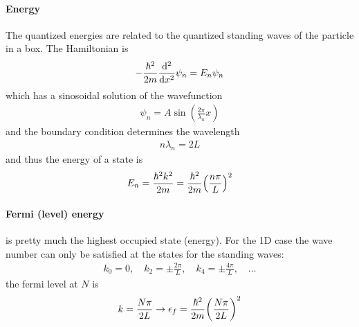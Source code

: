 \documentclass[../main.tex]{subfiles}
\begin{document}
\paragraph*{Energy} The quantized energies are related to the quantized standing waves of the 
particle in a box. The Hamiltonian is
\begin{align*}
    -\frac{\hbar^2}{2m} \dv[2]{x} \psi_n = E_n \psi_n
\end{align*}
which has a sinosoidal solution of the wavefunction
\begin{align*}
    \psi_n = A \sin(\frac{2\pi}{\lambda_n} x) 
\end{align*}
and the boundary condition determines the wavelength
\begin{align*}
    n \lambda_n = 2L
\end{align*}
and thus the energy of a state is
\begin{align*}
    E_n = \frac{\hbar^2 k^2}{2m} = \frac{\hbar^2}{2m} \qt(\frac{n\pi}{L})^2
\end{align*}

\paragraph*{Fermi (level) energy} is pretty much the highest occupied state (energy). For the 1D 
case the wave number can only be satisfied at the states for the standing waves:
\begin{align*}
    k_0 = 0, \quad k_2 = \pm \frac{2\pi}{L}, \quad k_4 = \pm \frac{4\pi}{L}, \quad \dots
\end{align*}
the fermi level at $N$ is
\begin{align*}
    k = \frac{N\pi}{2L} \to \epsilon_f = \frac{\hbar^2}{2m} \qt(\frac{N\pi}{2L})^2
\end{align*}
\end{document}
